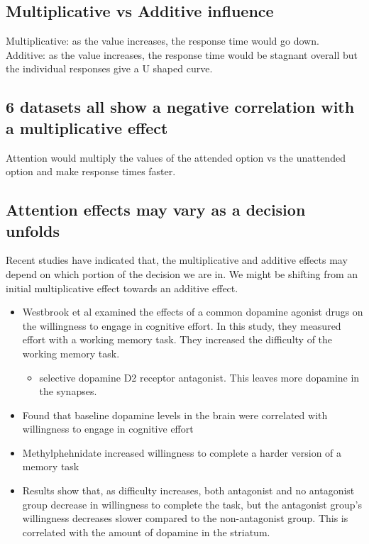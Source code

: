\subsection{Multiplicative vs Additive influence}
Multiplicative: as the value increases, the response time would go down. 
\\Additive: as the value increases, the response time would be stagnant overall but the individual responses give a U shaped curve.
\subsection{6 datasets all show a negative correlation with a multiplicative effect}
Attention would multiply the values of the attended option vs the unattended option and make response times faster.
\subsection{Attention effects may vary as a decision unfolds}
Recent studies have indicated that, the multiplicative and additive effects may depend on which portion of the decision we are in. We might be shifting from an initial multiplicative effect towards an additive effect.
\begin{itemize}
    \item Westbrook et al examined the effects of a common dopamine agonist drugs on the willingness to engage in cognitive effort. In this study, they measured effort with a working memory task. They increased the difficulty of the working memory task.
    \begin{itemize}
        \item selective dopamine D2 receptor antagonist. This leaves more dopamine in the synapses.

    \end{itemize}
    \item Found that baseline dopamine levels in the brain were correlated with willingness to engage in cognitive effort
    \item Methylphehnidate increased willingness to complete a harder version of a memory  task
    \item Results show that, as difficulty increases, both antagonist and no antagonist group decrease in willingness to complete the task, but the antagonist group's willingness decreases slower compared to the non-antagonist group. This is correlated with the amount of dopamine in the striatum.
\end{itemize}

